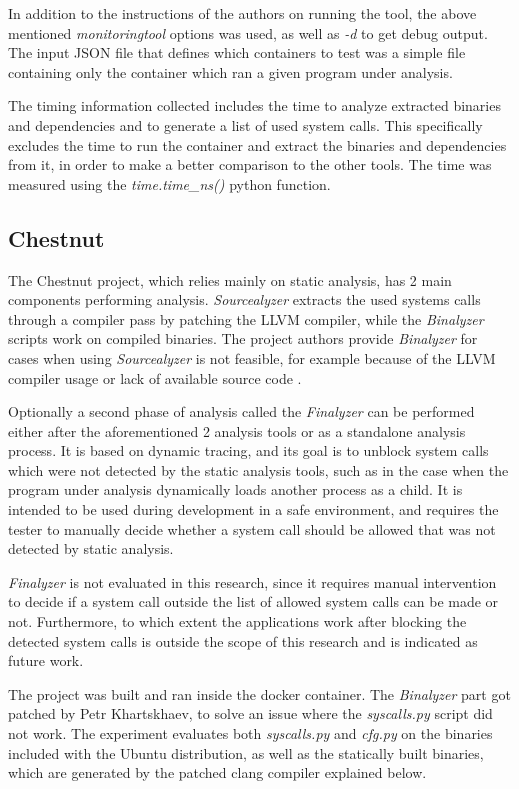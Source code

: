 In addition to the instructions of the authors on running the tool, the above mentioned \textit{monitoringtool} options was used, as well as \textit{-d} to get debug output.
The input JSON file that defines which containers to test was a simple file containing only the container which ran a given program under analysis.

The timing information collected includes the time to analyze extracted binaries and dependencies and to generate a list of used system calls. This specifically excludes the time to run the container and extract the binaries and dependencies from it, in order to make a better comparison to the other tools. The time was measured using the \textit{time.time\_ns()} python function.

\subsection {Chestnut}
The Chestnut \cite{ref_sp_1} project, which relies mainly on static analysis, has 2 main components performing analysis. \textit{Sourcealyzer} extracts the used systems calls through a compiler pass by patching the LLVM compiler, while the \textit{Binalyzer} scripts work on compiled binaries. The project authors provide \textit{Binalyzer} for cases when using \textit{Sourcealyzer} is not feasible, for example because of the LLVM compiler usage or lack of available source code \cite{ref_sp_1}.

Optionally a second phase of analysis called the \textit{Finalyzer} can be performed either after the aforementioned 2 analysis tools or as a standalone analysis process.
It is based on dynamic tracing, and its goal is to unblock system calls which were not detected by the static analysis tools, such as in the case when the program under analysis dynamically loads another process as a child.
It is intended to be used during development in a safe environment, and requires the tester to manually decide whether a system call should be allowed that was not detected by static analysis.

\textit{Finalyzer} is not evaluated in this research, since it requires manual intervention to decide if a system call outside the list of allowed system calls can be made or not.
Furthermore, to which extent the applications work after blocking the detected system calls is outside the scope of this research and is indicated as future work.

The project was built and ran inside the docker container. The \textit{Binalyzer} part got patched by Petr Khartskhaev, to solve an issue where the \textit{syscalls.py} script did not work.
The experiment evaluates both \textit{syscalls.py} and \textit{cfg.py} on the binaries included with the Ubuntu distribution, as well as the statically built binaries, which are generated by the patched clang compiler explained below.

